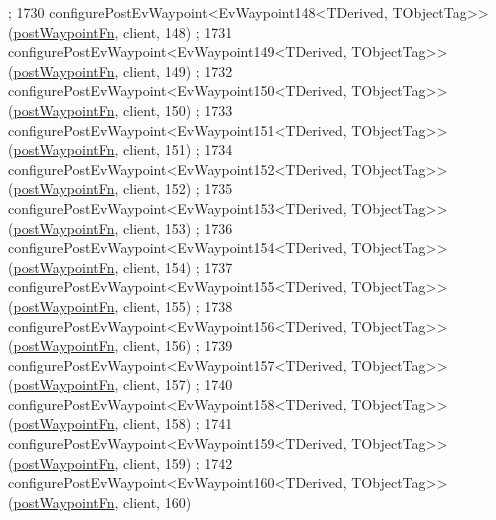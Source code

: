 \begin{DoxyCode}
      ;
1730     configurePostEvWaypoint<EvWaypoint148<TDerived, TObjectTag>>(\hyperlink{classmove__base__z__client_1_1WaypointEventDispatcher_acc538eb7506c13f7cca2268a1742dadd}{postWaypointFn}, client, 148)
      ;
1731     configurePostEvWaypoint<EvWaypoint149<TDerived, TObjectTag>>(\hyperlink{classmove__base__z__client_1_1WaypointEventDispatcher_acc538eb7506c13f7cca2268a1742dadd}{postWaypointFn}, client, 149)
      ;
1732     configurePostEvWaypoint<EvWaypoint150<TDerived, TObjectTag>>(\hyperlink{classmove__base__z__client_1_1WaypointEventDispatcher_acc538eb7506c13f7cca2268a1742dadd}{postWaypointFn}, client, 150)
      ;
1733     configurePostEvWaypoint<EvWaypoint151<TDerived, TObjectTag>>(\hyperlink{classmove__base__z__client_1_1WaypointEventDispatcher_acc538eb7506c13f7cca2268a1742dadd}{postWaypointFn}, client, 151)
      ;
1734     configurePostEvWaypoint<EvWaypoint152<TDerived, TObjectTag>>(\hyperlink{classmove__base__z__client_1_1WaypointEventDispatcher_acc538eb7506c13f7cca2268a1742dadd}{postWaypointFn}, client, 152)
      ;
1735     configurePostEvWaypoint<EvWaypoint153<TDerived, TObjectTag>>(\hyperlink{classmove__base__z__client_1_1WaypointEventDispatcher_acc538eb7506c13f7cca2268a1742dadd}{postWaypointFn}, client, 153)
      ;
1736     configurePostEvWaypoint<EvWaypoint154<TDerived, TObjectTag>>(\hyperlink{classmove__base__z__client_1_1WaypointEventDispatcher_acc538eb7506c13f7cca2268a1742dadd}{postWaypointFn}, client, 154)
      ;
1737     configurePostEvWaypoint<EvWaypoint155<TDerived, TObjectTag>>(\hyperlink{classmove__base__z__client_1_1WaypointEventDispatcher_acc538eb7506c13f7cca2268a1742dadd}{postWaypointFn}, client, 155)
      ;
1738     configurePostEvWaypoint<EvWaypoint156<TDerived, TObjectTag>>(\hyperlink{classmove__base__z__client_1_1WaypointEventDispatcher_acc538eb7506c13f7cca2268a1742dadd}{postWaypointFn}, client, 156)
      ;
1739     configurePostEvWaypoint<EvWaypoint157<TDerived, TObjectTag>>(\hyperlink{classmove__base__z__client_1_1WaypointEventDispatcher_acc538eb7506c13f7cca2268a1742dadd}{postWaypointFn}, client, 157)
      ;
1740     configurePostEvWaypoint<EvWaypoint158<TDerived, TObjectTag>>(\hyperlink{classmove__base__z__client_1_1WaypointEventDispatcher_acc538eb7506c13f7cca2268a1742dadd}{postWaypointFn}, client, 158)
      ;
1741     configurePostEvWaypoint<EvWaypoint159<TDerived, TObjectTag>>(\hyperlink{classmove__base__z__client_1_1WaypointEventDispatcher_acc538eb7506c13f7cca2268a1742dadd}{postWaypointFn}, client, 159)
      ;
1742     configurePostEvWaypoint<EvWaypoint160<TDerived, TObjectTag>>(\hyperlink{classmove__base__z__client_1_1WaypointEventDispatcher_acc538eb7506c13f7cca2268a1742dadd}{postWaypointFn}, client, 160)

\end{DoxyCode}
